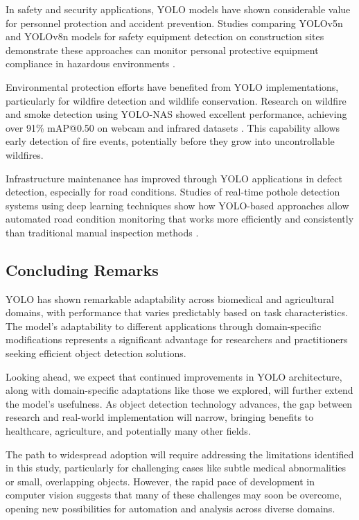 In safety and security applications, YOLO models have shown considerable value for personnel protection and accident prevention. Studies comparing YOLOv5n and YOLOv8n models for safety equipment detection on construction sites demonstrate these approaches can monitor personal protective equipment compliance in hazardous environments \citep{Karasu2024}.

Environmental protection efforts have benefited from YOLO implementations, particularly for wildfire detection and wildlife conservation. Research on wildfire and smoke detection using YOLO-NAS showed excellent performance, achieving over 91\% mAP@0.50 on webcam and infrared datasets \citep{Tsitos2024}. This capability allows early detection of fire events, potentially before they grow into uncontrollable wildfires.

Infrastructure maintenance has improved through YOLO applications in defect detection, especially for road conditions. Studies of real-time pothole detection systems using deep learning techniques show how YOLO-based approaches allow automated road condition monitoring that works more efficiently and consistently than traditional manual inspection methods \citep{Kumar2024}.

\subsection{Concluding Remarks}

YOLO has shown remarkable adaptability across biomedical and agricultural domains, with performance that varies predictably based on task characteristics. The model's adaptability to different applications through domain-specific modifications represents a significant advantage for researchers and practitioners seeking efficient object detection solutions.

Looking ahead, we expect that continued improvements in YOLO architecture, along with domain-specific adaptations like those we explored, will further extend the model's usefulness. As object detection technology advances, the gap between research and real-world implementation will narrow, bringing benefits to healthcare, agriculture, and potentially many other fields.

The path to widespread adoption will require addressing the limitations identified in this study, particularly for challenging cases like subtle medical abnormalities or small, overlapping objects. However, the rapid pace of development in computer vision suggests that many of these challenges may soon be overcome, opening new possibilities for automation and analysis across diverse domains.